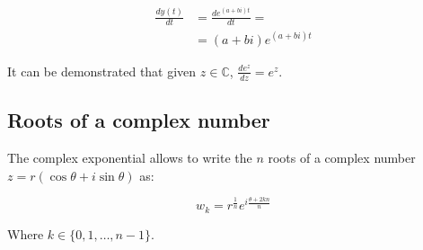 	\begin{align*}
		\frac{dy(t)}{dt} &= \frac{de^{(a+bi)t}}{dt}=\\
										 &= (a+bi)e^{(a+bi)t}
	\end{align*}

	It can be demonstrated that given $z\in\mathbb{C}$, $\frac{de^z}{dz} = e^z$.

	\subsection{Roots of a complex number}
	The complex exponential allows to write the $n$ roots of a complex number $z = r(\cos\theta + i\sin\theta)$ as:

	$$w_k = r^\frac{1}{n}e^{i\frac{\theta+2kn}{n}}$$

	Where $k\in\{0, 1, \dots, n-1\}$.
